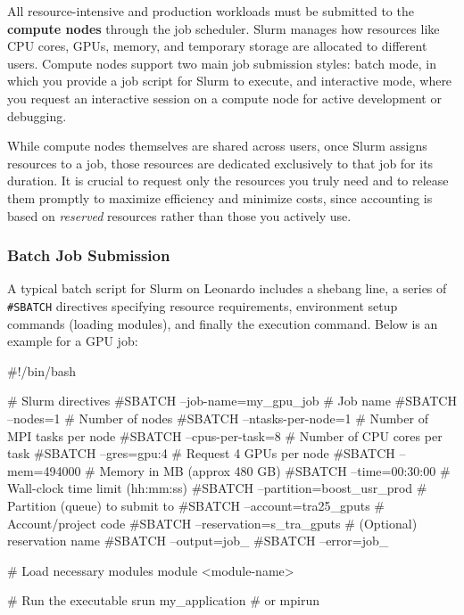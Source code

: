 All resource-intensive and production workloads must be submitted to the \textbf{compute nodes} through the  job scheduler. Slurm manages how resources like CPU cores, GPUs, memory, and temporary storage are allocated to different users. Compute nodes support two main job submission styles: batch mode, in which you provide a job script for Slurm to execute, and interactive mode, where you request an interactive session on a compute node for active development or debugging.

While compute nodes themselves are shared across users, once Slurm assigns resources to a job, those resources are dedicated exclusively to that job for its duration. It is crucial to request only the resources you truly need and to release them promptly to maximize efficiency and minimize costs, since accounting is based on \textit{reserved} resources rather than those you actively use.

\subsubsection{Batch Job Submission}

A typical batch script for Slurm on Leonardo includes a shebang line, a series of \texttt{\#SBATCH} directives specifying resource requirements, environment setup commands (loading modules), and finally the execution command. Below is an example for a GPU job:

\begin{codeblock}[language=bash]
#!/bin/bash

# Slurm directives
#SBATCH --job-name=my_gpu_job       # Job name
#SBATCH --nodes=1                   # Number of nodes
#SBATCH --ntasks-per-node=1         # Number of MPI tasks per node
#SBATCH --cpus-per-task=8           # Number of CPU cores per task
#SBATCH --gres=gpu:4                # Request 4 GPUs per node
#SBATCH --mem=494000                # Memory in MB (approx 480 GB)
#SBATCH --time=00:30:00             # Wall-clock time limit (hh:mm:ss)
#SBATCH --partition=boost_usr_prod  # Partition (queue) to submit to
#SBATCH --account=tra25_gputs       # Account/project code
#SBATCH --reservation=s_tra_gputs   # (Optional) reservation name
#SBATCH --output=job_%
#SBATCH --error=job_%

# Load necessary modules
module <module-name>

# Run the executable
srun my_application # or mpirun
\end{codeblock}

